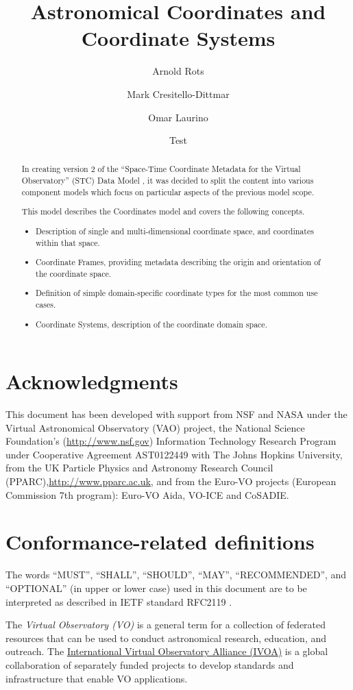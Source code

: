 \documentclass[11pt,a4paper]{ivoa}
\title{Astronomical Coordinates and Coordinate Systems}
\author{Arnold Rots}
\author{Mark Cresitello-Dittmar}
\author{Omar Laurino}
\author{Test}
\begin{document}
\begin{abstract}
  In creating version 2 of the ``Space-Time Coordinate Metadata for the Virtual Observatory'' (STC) Data Model \citep{std:STC}, it was decided to split the content into various component models which focus on particular aspects of the previous model scope.  
  
  This model describes the Coordinates model and covers the following concepts.
  \begin{itemize}
  \item Description of single and multi-dimensional coordinate space, and coordinates within that space.
  \item Coordinate Frames, providing metadata describing the origin and orientation of the coordinate space.
  \item Definition of simple domain-specific coordinate types for the most common use cases.
  \item Coordinate Systems, description of the coordinate domain space.
  \end{itemize}
\end{abstract}


\section*{Acknowledgments}
This document has been developed with support from NSF and NASA under the Virtual Astronomical Observatory (VAO) project, the National Science Foundation’s (\url{http://www.nsf.gov}) Information Technology Research Program under Cooperative Agreement AST0122449 with The Johns Hopkins University, from the UK Particle Physics and Astronomy Research Council (PPARC),\url{http://www.pparc.ac.uk}, and from the Euro-VO projects (European Commission 7th program): Euro-VO Aida, VO-ICE and CoSADIE.

\section*{Conformance-related definitions}

The words ``MUST'', ``SHALL'', ``SHOULD'', ``MAY'', ``RECOMMENDED'', and
``OPTIONAL'' (in upper or lower case) used in this document are to be
interpreted as described in IETF standard RFC2119 \citep{std:RFC2119}.

The \emph{Virtual Observatory (VO)} is a
general term for a collection of federated resources that can be used
to conduct astronomical research, education, and outreach.
The \href{http://www.ivoa.net}{International
Virtual Observatory Alliance (IVOA)} is a global
collaboration of separately funded projects to develop standards and
infrastructure that enable VO applications.
\end{document}
